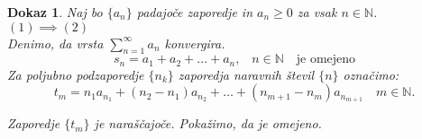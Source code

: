 \documentclass{beamer}
\newtheorem{dokaz}{Dokaz}
\def\N{\mathbb{N}} %
\begin{document}
\begin{frame}
    \begin{dokaz}
        Naj bo $\{a_n\}$ padajoče zaporedje in $a_n \geq 0$ za vsak $n \in \N$.\\
        $(1) \implies (2)$\\
        Denimo, da vrsta $\sum_{n = 1}^{\infty}{a_n}$ konvergira.
        \pause
        \[
        s_n = a_1 + a_2 + \ldots + a_n \text{,}\quad  n \in \N \quad \text{je omejeno}
        \] 
        \pause
        Za poljubno podzaporedje $\{n_k\}$ zaporedja naravnih števil $\{n\}$ označimo:
        \[
        t_m =  n_1a_{n_1} + (n_2 - n_1)a_{n_2} + \ldots + (n_{m + 1} - n_{m})a_{n_{m+ 1}} \quad m \in \N \text{.}
        \]

        \pause
        Zaporedje $\{t_m\}$ je naraščajoče.
        Pokažimo, da je omejeno.  
    \end{dokaz}    
\end{frame}
\end{document}
